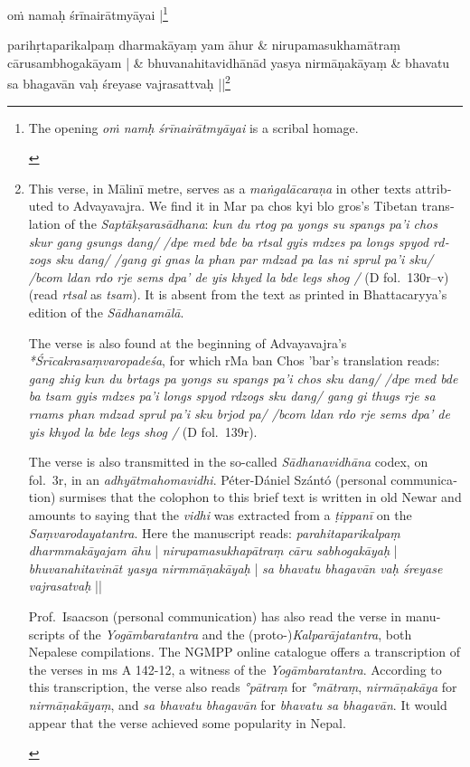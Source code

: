 \documentclass[naipra.tex]{subfiles}
\begin{document}
\beginnumbering
\begin{sanskrit}
\pstart\noindent
{}oṁ namaḥ śrīnairātmyāyai |\footnote{
	\begin{english}%
		The opening \emph{oṁ namḥ śrīnairātmyāyai} is a scribal homage.
	\end{english}
}
\pend

\medskip\versequote
parihṛtaparikalpaṃ dharmakāyaṃ yam āhur &
\hspace{20pt}nirupamasukhamātraṃ cārusambhogakāyam | \&
\versequote
bhuvanahitavidhānād yasya nirmāṇakāyaṃ &
\hspace{20pt}bhavatu sa bhagavān vaḥ śreyase vajrasattvaḥ ||\footnote{
	\begin{english}%
		This verse, in Mālinī metre, serves as a \emph{maṅgalācaraṇa} in other texts attributed to Advayavajra.
		We find it in Mar pa chos kyi blo gros's Tibetan translation of the \emph{Saptākṣarasādhana}: \emph{kun du rtog pa yongs su spangs pa'i chos skur gang gsungs dang/ /dpe med bde ba rtsal gyis mdzes pa longs spyod rdzogs sku dang/ /gang gi gnas la phan par mdzad pa las ni sprul pa'i sku/ /bcom ldan rdo rje sems dpa' de yis khyed la bde legs shog /} (D fol.\ 130r–v) (read \emph{rtsal} as \emph{tsam}).
		It is absent from the text as printed in Bhattacaryya's edition of the \emph{Sādhanamālā}.

		The verse is also found at the beginning of Advayavajra's \emph{*Śrīcakrasaṃvaropadeśa}, for which rMa ban Chos 'bar's translation reads: \emph{gang zhig kun du brtags pa yongs su spangs pa'i chos sku dang/ /dpe med bde ba tsam gyis mdzes pa'i longs spyod rdzogs sku dang/ gang gi thugs rje sa rnams phan mdzad sprul pa'i sku brjod pa/ /bcom ldan rdo rje sems dpa' de yis khyod la bde legs shog /} (D fol.\ 139r).

		The verse is also transmitted in the so-called \emph{Sādhanavidhāna} codex, on fol.\ 3r, in an \emph{adhyātmahomavidhi}.
		Péter-Dániel Szántó (personal communication) surmises that the colophon to this brief text is written in old Newar and amounts to saying that the \emph{vidhi} was extracted from a \emph{ṭippanī} on the \emph{Saṃvarodayatantra}. 
		Here the manuscript reads: \emph{parahitaparikalpaṃ dharmmakāyajam āhu} | \emph{nirupamasukhapātraṃ cāru sabhogakāyaḥ} | \emph{bhuvanahitavināt yasya nirmmāṇakāyaḥ} | \emph{sa bhavatu bhagavān vaḥ śreyase vajrasatvaḥ} ||

		Prof.\ Isaacson (personal communication) has also read the verse in manuscripts of the \emph{Yogāmbaratantra} and the (proto-)\emph{Kalparājatantra}, both Nepalese compilations.
		The NGMPP online catalogue offers a transcription of the verses in ms A 142-12, a witness of the \emph{Yogāmbaratantra}.
		According to this transcription, the verse also reads \emph{°pātraṃ} for \emph{°mātraṃ}, \emph{nirmāṇakāya} for \emph{nirmāṇakāyaṃ}, and \emph{sa bhavatu bhagavān} for \emph{bhavatu sa bhagavān}.
		It would appear that the verse achieved some popularity in Nepal.


\end{english}}
\end{sanskrit}
\end{document}
